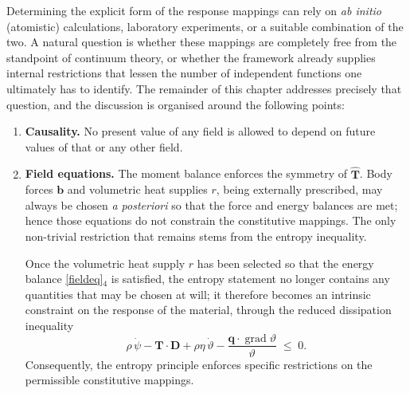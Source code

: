\vspace{0.5em}

\noindent
Determining the explicit form of the response mappings can rely on
\emph{ab initio} (atomistic) calculations, laboratory experiments, or
a suitable combination of the two.
A natural question is whether these mappings are completely free from
the standpoint of continuum theory, or whether the framework already
supplies internal restrictions that lessen the number of independent
functions one ultimately has to identify.
The remainder of this chapter addresses precisely that question, and
the discussion is organised around the following points:
\begin{enumerate}
	\item \textbf{Causality.}\;
	No present value of any field is allowed to depend on future
	values of that or any other field.
	\item \textbf{Field equations.}\;
	The moment balance enforces the symmetry of
	\(\widehat{\mathbf{T}}\).
	Body forces \(\mathbf{b}\) and volumetric heat supplies \(r\),
	being externally prescribed, may always be chosen
	\emph{a posteriori} so that the force and energy
	balances are met; hence those
	equations do not constrain the constitutive mappings.
	The only non-trivial restriction that remains stems from the
	entropy inequality.



Once the volumetric heat supply \(r\) has been selected so that the
energy balance \eqref{fieldeq}\(_4\) is satisfied, the entropy statement no longer
contains any quantities that may be chosen at will; it therefore becomes
an intrinsic constraint on the response of the material, through the reduced dissipation inequality
\begin{equation}
	\rho\,\dot{\psi}
	- \mathbf{T}\!\cdot\!\mathbf{D}
	+ \rho\eta\,\dot{\vartheta}
	- \frac{\mathbf{q}\!\cdot\!\operatorname{grad}\vartheta}{\vartheta}
	\;\le\; 0.
\end{equation}
Consequently, the entropy principle enforces specific restrictions on
the permissible constitutive mappings.




\end{enumerate}
